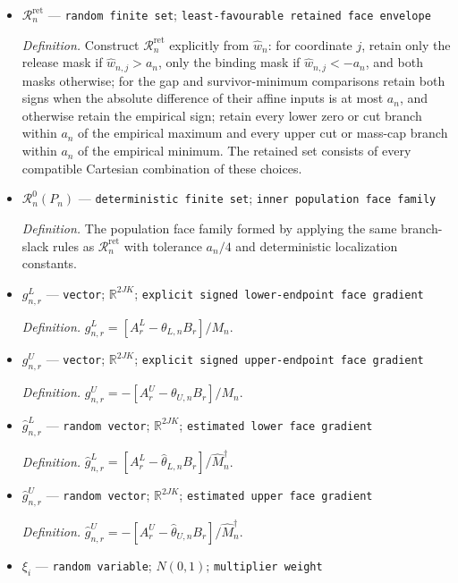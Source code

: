 \documentclass{article}
\begin{document}
\begin{itemize}
  \item \(\mathcal R_n^{\mathrm{ret}}\) --- \texttt{random finite set}; \texttt{least-\allowbreak{}favourable retained face envelope}
  \par\smallskip\noindent\emph{Definition.} Construct \(\mathcal R_n^{\mathrm{ret}}\) explicitly from \(\widehat w_n\): for coordinate \(j\), retain only the release mask if \(\widehat w_{n,j}>a_n\), only the binding mask if \(\widehat w_{n,j}<-a_n\), and both masks otherwise; for the gap and survivor-minimum comparisons retain both signs when the absolute difference of their affine inputs is at most \(a_n\), and otherwise retain the empirical sign; retain every lower zero or cut branch within \(a_n\) of the empirical maximum and every upper cut or mass-cap branch within \(a_n\) of the empirical minimum. The retained set consists of every compatible Cartesian combination of these choices.
  \item \(\mathcal R_n^0(P_n)\) --- \texttt{deterministic finite set}; \texttt{inner population face family}
  \par\smallskip\noindent\emph{Definition.} The population face family formed by applying the same branch-slack rules as \(\mathcal R_n^{\mathrm{ret}}\) with tolerance \(a_n/4\) and deterministic localization constants.
  \item \(g^L_{n,r}\) --- \texttt{vector}; \(\mathbb R^{2JK}\); \texttt{explicit signed lower-\allowbreak{}endpoint face gradient}
  \par\smallskip\noindent\emph{Definition.} \(g^L_{n,r}=[A^L_r-\theta_{L,n}B_r]/M_n\).
  \item \(g^U_{n,r}\) --- \texttt{vector}; \(\mathbb R^{2JK}\); \texttt{explicit signed upper-\allowbreak{}endpoint face gradient}
  \par\smallskip\noindent\emph{Definition.} \(g^U_{n,r}=-[A^U_r-\theta_{U,n}B_r]/M_n\).
  \item \(\widehat g^L_{n,r}\) --- \texttt{random vector}; \(\mathbb R^{2JK}\); \texttt{estimated lower face gradient}
  \par\smallskip\noindent\emph{Definition.} \(\widehat g^L_{n,r}=[A^L_r-\widehat\theta_{L,n}B_r]/\widehat M_n^{\dagger}\).
  \item \(\widehat g^U_{n,r}\) --- \texttt{random vector}; \(\mathbb R^{2JK}\); \texttt{estimated upper face gradient}
  \par\smallskip\noindent\emph{Definition.} \(\widehat g^U_{n,r}=-[A^U_r-\widehat\theta_{U,n}B_r]/\widehat M_n^{\dagger}\).
  \item \(\xi_i\) --- \texttt{random variable}; \(N(0,1)\); \texttt{multiplier weight}

\end{itemize}
\end{document}
